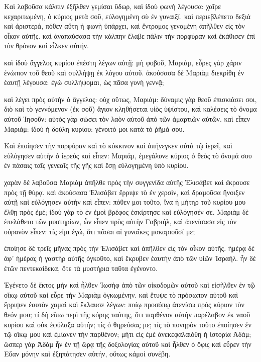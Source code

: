 \pend\pstart
{}

\pend\setcounter{pstartL}{1}\pstart
Καὶ λαβοῦσα κάλπιν ἐξῆλθεν γεμίσαι ὕδωρ, καὶ ἰδοὺ φωνὴ λέγουσα: χαῖρε κεχαριτωμένη, ὁ κύριος μετὰ σοῦ, εὐλογημένη σὺ ἐν γυναιξί. καὶ περιεβλέπετο δεξιὰ καὶ ἀριστερά, πόθεν αὕτη ἡ φωνὴ ὑπάρχει, καὶ ἔντρομος γενομένη ἀπῆλθεν εἰς τὸν οἶκον αὐτῆς. καὶ ἀναπαύσασα τὴν κάλπην ἔλαβε πάλιν τὴν πορφύραν καὶ ἐκάθισεν ἐπὶ τὸν θρόνον καὶ εἷλκεν αὐτήν.

\pend\pstart
καὶ ἰδοὺ ἄγγελος κυρίου ἐπέστη λέγων αὐτῇ: μὴ φοβοῦ, Μαριάμ, εὗρες γὰρ χάριν ἐνώπιον τοῦ θεοῦ καὶ συλλήψῃ ἐκ λόγου αὐτοῦ. ἀκούσασα δὲ Μαριὰμ διεκρίθη ἐν ἑαυτῇ λέγουσα: ἐγὼ συλλήψομαι, ὡς πᾶσα γυνὴ γεννᾷ;

\pend\pstart
καὶ λέγει πρὸς αὐτὴν ὁ ἄγγελος: οὐχ οὕτως, Μαριάμ: δύναμις γὰρ θεοῦ ἐπισκιάσει σοι, διὸ καὶ τὸ γεννόμενον (ἐκ σοῦ) ἅγιον κληθήσεται υἱὸς ὑψίστου, καὶ καλέσεις τὸ ὄνομα αὐτοῦ Ἰησοῦν: αὐτὸς γὰρ σώσει τὸν λαὸν αὐτοῦ ἀπὸ τῶν ἁμαρτιῶν αὐτῶν. καὶ εἶπεν Μαριάμ: ἰδοὺ ἡ δούλη κυρίου: γένοιτό μοι κατὰ τὸ ῥῆμά σου.

\pend\pstart
{}

\pend\setcounter{pstartL}{1}\pstart
Καὶ ἐποίησεν τὴν πορφύραν καὶ τὸ κόκκινον καὶ ἀπήνεγκεν αὐτὰ τῷ ἱερεῖ, καὶ εὐλόγησεν αὐτὴν ὁ ἱερεὺς καὶ εἶπεν: Μαριάμ, ἐμεγάλυνε κύριος ὁ θεὸς τὸ ὄνομά σου ἐν πάσαις ταῖς γενεαῖς τῆς γῆς καὶ ἔσῃ εὐλογημένη ὑπὸ κυρίου.

\pend\pstart
χαρὰν δὲ λαβοῦσα Μαριὰμ ἀπῆλθε πρὸς τὴν συγγενίδα αὐτῆς Ἐλισάβετ καὶ ἔκρουσε πρὸς τῇ θύρᾳ. καὶ ἀκούσασα Ἐλισάβετ ἔρριψε τὸ ἐν χερσὶν, καὶ δραμοῦσα ἤνοιξεν αὐτῇ καὶ εὐλόγησεν αὐτὴν καὶ εἶπεν: πόθεν μοι τοῦτο, ἵνα ἡ μήτηρ τοῦ κυρίου μου ἔλθῃ πρὸς ἐμέ; ἰδοὺ γὰρ τὸ ἐν ἐμοὶ βρέφος ἐσκίρτησε καὶ εὐλόγησέν σε. Μαριὰμ δὲ ἐπελάθετο τῶν μυστηρίων, ὧν εἶπεν πρὸς αὐτὴν Γαβριήλ, καὶ ἀτενίσασα εἰς τὸν οὐρανὸν εἶπεν: τίς εἰμι ἐγώ, ὅτι πᾶσαι αἱ γυναῖκες μακαριοῦσί με;

\pend\pstart
ἐποίησε δὲ τρεῖς μῆνας πρὸς τὴν Ἐλισάβετ καὶ ἀπῆλθεν εἰς τὸν οἶκον αὐτῆς. ἡμέρᾳ δὲ ἀφ' ἡμέρας ἡ γαστὴρ αὐτῆς ὀγκοῦτο, καὶ ἔκρυβεν ἑαυτὴν ἀπὸ τῶν υἱῶν Ἰσραήλ. ἦν δὲ ἐτῶν πεντεκαίδεκα, ὅτε τὰ μυστήρια ταῦτα ἐγένοντο.

\pend\pstart
{}

\pend\setcounter{pstartL}{1}\pstart
Ἐγένετο δὲ ἕκτος μὴν καὶ ἦλθεν Ἰωσὴφ ἀπὸ τῶν οἰκοδομῶν αὐτοῦ καὶ εἰσῆλθεν ἐν τῷ οἴκῳ αὐτοῦ καὶ εὗρε τὴν Μαριὰμ ὀγκωμένην. καὶ ἔτυψε τὸ πρόσωπον αὐτοῦ καὶ ἔρριψεν ἑαυτὸν χαμαὶ καὶ ἔκλαυσε λέγων: ποίῳ προσόπῳ ἀτενίσω πρὸς κύριον τὸν θεόν μου; τί δὴ εἴπω περὶ τῆς κόρης ταύτης, ὅτι παρθένον αὐτὴν παρέλαβον ἐκ ναοῦ κυρίου καὶ οὐκ ἐφύλαξα αὐτήν; τίς ὁ θηρεύσας με; τίς τὸ πονηρὸν τοῦτο ἐποίησεν ἐν τῷ οἴκῳ μου καὶ ἐμίανεν τὴν παρθένον; μήτι εἰς ἐμὲ ἀνεκεφαλαιόθη ἡ ἱστορία Ἀδάμ; ὥσπερ γὰρ Ἀδὰμ ἦν ἐν τῇ ὥρᾳ τῆς δοξολογίας αὐτοῦ καὶ ἦλθεν ὁ ὄφις καὶ εὗρεν τὴν Εὔαν μόνην καὶ ἐξηπάτησεν αὐτήν, οὕτως κἀμοί συνέβη.

